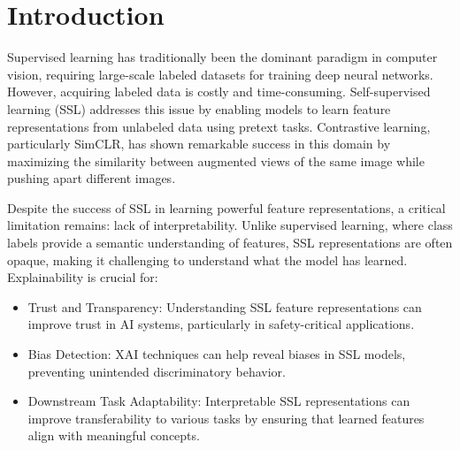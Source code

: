 \section{Introduction}
\label{sec:intro}

Supervised learning has traditionally been the dominant paradigm in computer vision, requiring large-scale labeled datasets for training deep neural networks. However, acquiring labeled data is costly and time-consuming. Self-supervised learning (SSL) addresses this issue by enabling models to learn feature representations from unlabeled data using pretext tasks. Contrastive learning, particularly SimCLR, has shown remarkable success in this domain by maximizing the similarity between augmented views of the same image while pushing apart different images.

Despite the success of SSL in learning powerful feature representations, a critical limitation remains: lack of interpretability. Unlike supervised learning, where class labels provide a semantic understanding of features, SSL representations are often opaque, making it challenging to understand what the model has learned. Explainability is crucial for:
\begin{itemize}
    \item Trust and Transparency: Understanding SSL feature representations can improve trust in AI systems, particularly in safety-critical applications.
    \item Bias Detection: XAI techniques can help reveal biases in SSL models, preventing unintended discriminatory behavior.
    \item Downstream Task Adaptability: Interpretable SSL representations can improve transferability to various tasks by ensuring that learned features align with meaningful concepts.
\end{itemize}
